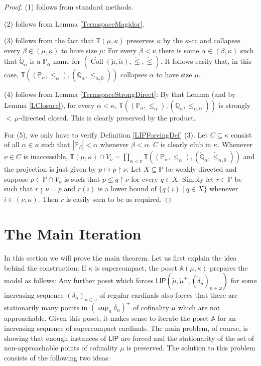 \documentclass[a4paper]{amsart}
\theoremstyle{definition}
\theoremstyle{remark}
\theoremstyle{plain}
\numberwithin{mydef}{section}
\DeclareMathOperator{\Coll}{Coll}
\newcommand{\dA}{\mathbb{A}}
\newcommand{\dP}{\mathbb{P}}
\newcommand{\dQ}{\mathbb{Q}}
\newcommand{\dT}{\mathbb{T}}
\newcommand{\uhr}{\upharpoonright}
\newcommand{\LIP}{\mathsf{LIP}}
\begin{document}
	\begin{proof}
		(1) follows from standard methods.
		
		(2) follows from Lemma \ref{TermspaceMagidor}.
		
		(3) follows from the fact that $\dT(\mu,\kappa)$ preserves $\kappa$ by the $\kappa$-cc and collapses every $\beta\in(\mu,\kappa)$ to have size $\mu$: For every $\beta<\kappa$ there is some $\alpha\in(\beta,\kappa)$ such that $\dot{\dQ}_{\alpha}$ is a $\dP_{\alpha}$-name for $(\dot{\Coll}(\check{\mu},\check{\alpha}),\dot{\leq},\dot{\leq})$. It follows easily that, in this case, $\dT((\dP_{\alpha},\leq_{\alpha}),(\dot{\dQ}_{\alpha},\dot{\leq}_{\alpha,0}))$ collapses $\alpha$ to have size $\mu$.
		
		(4) follows from Lemma \ref{TermspaceStrongDirect}: By that Lemma (and by Lemma \ref{LClosure}), for every $\alpha<\kappa$, $\dT((\dP_{\alpha},\leq_{\alpha}),(\dot{\dQ}_{\alpha},\dot{\leq}_{\alpha,0}))$ is strongly ${<}\,\mu$-directed closed. This is clearly preserved by the product.
		
		For (5), we only have to verify Definition \ref{LIPForcingDef} (3). Let $C\subseteq\kappa$ consist of all $\alpha\in\kappa$ such that $|\dP_{\beta}|<\alpha$ whenever $\beta<\alpha$. $C$ is clearly club in $\kappa$. Whenever $\nu\in C$ is inaccessible, $\dT(\mu,\kappa)\cap V_{\nu}=\prod_{\alpha<\nu}\dT((\dP_{\alpha},\leq_{\alpha}),(\dot{\dQ}_{\alpha},\dot{\leq}_{\alpha,0}))$ and the projection is just given by $p\mapsto p\uhr\nu$. Let $X\subseteq\dP$ be weakly directed and suppose $p\in\dP\cap V_{\nu}$ is such that $p\leq q\uhr\nu$ for every $q\in X$. Simply let $r\in\dP$ be such that $r\uhr\nu=p$ and $r(i)$ is a lower bound of $\{q(i)\;|\;q\in X\}$ whenever $i\in(\nu,\kappa)$. Then $r$ is easily seen to be as required.
	\end{proof}
	
	\section{The Main Iteration}
	
	In this section we will prove the main theorem. Let us first explain the idea behind the construction: If $\kappa$ is supercompact, the poset $\dA(\mu,\kappa)$ prepares the model as follows: Any further poset which forces $\LIP(\check{\mu},\check{\mu}^+,(\check{\delta}_n)_{n\in\omega})$ for some increasing sequence $(\delta_n)_{n\in\omega}$ of regular cardinals also forces that there are stationarily many points in $(\sup_n\delta_n)^+$ of cofinality $\mu$ which are not approachable. Given this poset, it makes sense to iterate the poset $\dA$ for an increasing sequence of supercompact cardinals. The main problem, of course, is showing that enough instances of $\LIP$ are forced and the stationarity of the set of non-approachable points of cofinality $\mu$ is preserved. The solution to this problem consists of the following two ideas:
	
\end{document}
